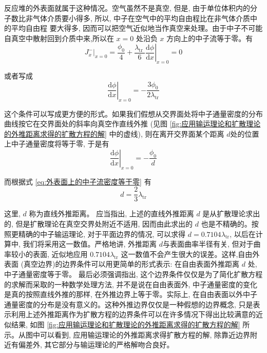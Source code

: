 \documentclass{Sichuan Normal University}
\begin{document}
\begin{itemize}
反应堆的外表面就属于这种情况。空气虽然不是真空, 但是, 由于单位体积内的分子数比非气体介质要小得多, 所以, 中子在空气中的平均自由程比在非气体介质中的平均自由程
要大得多, 因而可以把空气近似地当作真空来处理。由于中子不可能自真空中散射回到介质中来,所以在 $x=0$ 处沿负 $x$ 方向上的中子流等于零。有
\begin{equation}
\left.J_x^{-}\right|_{x=0}=\frac{\phi_0}{4}+\left.\frac{\lambda_{\text {tr }}}{6} \frac{\mathrm{d} \phi}{\mathrm{d} x}\right|_{x=0}=0
\end{equation}

或者写成
\begin{equation}
\left.\frac{\mathrm{d} \phi}{\mathrm{d} x}\right|_{x=0}=-\frac{3 \phi_0}{2 \lambda_{\mathrm{tr}}}
\label{eq:外表面上的中子流密度等于零}
\end{equation}

这个条件可以写成更方便的形式。如果我们假想从交界面处将中子通量密度的分布曲线按它在交界面处的斜率向真空作直线外推 (见图 \ref{fig:应用输运理论和扩散理论的外推距离求得的扩散方程的解} 中的虚线), 则在离开交界面某个距离 $d$处的位置上中子通量密度将等于零, 于是有
\begin{equation}
\left.\frac{\mathrm{d} \phi}{\mathrm{d} x}\right|_{x=0}=-\frac{\phi_0}{d}
\end{equation}

而根据式 \eqref{eq:外表面上的中子流密度等于零} 有
\begin{equation}
d=\frac{2}{3} \lambda_{\mathrm{tr}}
\end{equation}

这里, $d$ 称为直线外推距离。
应当指出, 上述的直线外推距离 $d$ 是从扩散理论求出的, 但是扩散理论在真空交界处附近不适用, 因而由此求出的 $d$ 也是不精确的。按照更精确的中子输运理论, 对于平面边界的情况, 可以求得 $d=0.7104 \lambda_{\mathrm{tr}}$, 以后在计算中, 我们将采用这一数值。严格地讲, 外推距离 $d$与表面曲率半径有关, 但对于曲率较小的表面, 近似地应用 $0.7104 \lambda_{\mathrm{tr}}$ 这一数值不会产生很大的误差。这样,自由外表面 (真空边界)的边界条件可以用更简单的形式表示:
在自由表面外推距离 $d$ 处, 中子通量密度等于零。
最后必须强调指出, 这个边界条件仅仅是为了简化扩散方程的求解而采取的一种数学处理方法, 并不是说在自由表面外, 中子通量密度的变化是真的按照直线外推的那样, 在外推边界上等于零。实际上, 在自由表面以外中子通量密度的分布是没有意义的。这种外推边界仅仅是一种假想的边界概念, 只是表示利用上述外推距离作为扩散方程的边界条件可以在许多情况下得出比较满意的近似结果, 如图 \ref{fig:应用输运理论和扩散理论的外推距离求得的扩散方程的解} 所示。从图中可以看到, 应用输运理论的外推距离求得扩散方程的解, 除靠近边界附近有偏差外, 其它部分与输运理论的严格解吻合良好。



\end{itemize}
\end{document}
